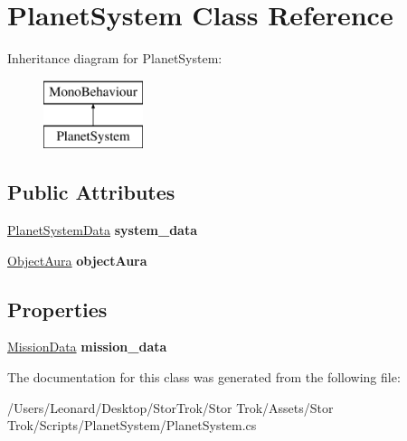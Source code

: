 \hypertarget{class_planet_system}{}\section{Planet\+System Class Reference}
\label{class_planet_system}
Inheritance diagram for Planet\+System\+:\begin{figure}[H]
\begin{center}
\leavevmode
\includegraphics[height=2.000000cm]{class_planet_system}
\end{center}
\end{figure}
\subsection*{Public Attributes}
\begin{DoxyCompactItemize}
\item 
\mbox{\label{class_planet_system_ad561d9c8c00e82b52a040e1211470ebe}} 
\hyperlink{class_planet_system_data}{Planet\+System\+Data} {\bfseries system\+\_\+data}
\item 
\mbox{\label{class_planet_system_a85d46b9451246456b9fab5964d300e6c}} 
\hyperlink{class_object_aura}{Object\+Aura} {\bfseries object\+Aura}
\end{DoxyCompactItemize}
\subsection*{Properties}
\begin{DoxyCompactItemize}
\item 
\mbox{\label{class_planet_system_a865ebeaf11a954f5cc7249935d055dfd}} 
\hyperlink{class_mission_data}{Mission\+Data} {\bfseries mission\+\_\+data}
\end{DoxyCompactItemize}


The documentation for this class was generated from the following file\+:\begin{DoxyCompactItemize}
\item 
/\+Users/\+Leonard/\+Desktop/\+Stor\+Trok/\+Stor Trok/\+Assets/\+Stor Trok/\+Scripts/\+Planet\+System/Planet\+System.\+cs\end{DoxyCompactItemize}

